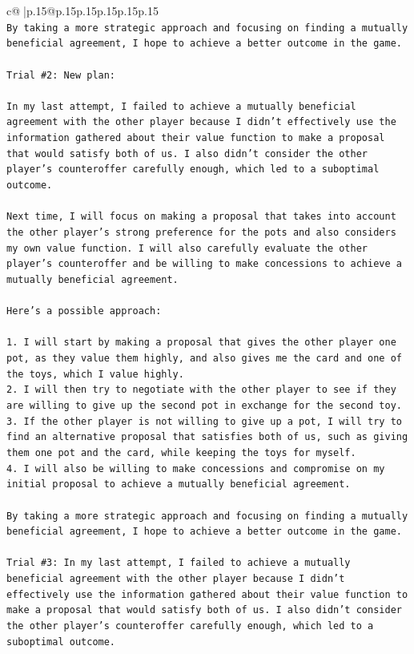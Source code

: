 \documentclass{article}
\begin{document}
{\begin{supertabular}{c@{$\;$}|p{.15\linewidth}@{}p{.15\linewidth}p{.15\linewidth}p{.15\linewidth}p{.15\linewidth}p{.15\linewidth}}
{{{\\ 
\texttt{By taking a more strategic approach and focusing on finding a mutually beneficial agreement, I hope to achieve a better outcome in the game.} \\
\\ 
\texttt{Trial \#2: New plan: } \\
\\ 
\texttt{In my last attempt, I failed to achieve a mutually beneficial agreement with the other player because I didn't effectively use the information gathered about their value function to make a proposal that would satisfy both of us. I also didn't consider the other player's counteroffer carefully enough, which led to a suboptimal outcome.} \\
\\ 
\texttt{Next time, I will focus on making a proposal that takes into account the other player's strong preference for the pots and also considers my own value function. I will also carefully evaluate the other player's counteroffer and be willing to make concessions to achieve a mutually beneficial agreement.} \\
\\ 
\texttt{Here's a possible approach:} \\
\\ 
\texttt{1. I will start by making a proposal that gives the other player one pot, as they value them highly, and also gives me the card and one of the toys, which I value highly.} \\
\texttt{2. I will then try to negotiate with the other player to see if they are willing to give up the second pot in exchange for the second toy.} \\
\texttt{3. If the other player is not willing to give up a pot, I will try to find an alternative proposal that satisfies both of us, such as giving them one pot and the card, while keeping the toys for myself.} \\
\texttt{4. I will also be willing to make concessions and compromise on my initial proposal to achieve a mutually beneficial agreement.} \\
\\ 
\texttt{By taking a more strategic approach and focusing on finding a mutually beneficial agreement, I hope to achieve a better outcome in the game.} \\
\\ 
\texttt{Trial \#3: In my last attempt, I failed to achieve a mutually beneficial agreement with the other player because I didn't effectively use the information gathered about their value function to make a proposal that would satisfy both of us. I also didn't consider the other player's counteroffer carefully enough, which led to a suboptimal outcome.} \\
}}}
\end{supertabular}}
\end{document}
